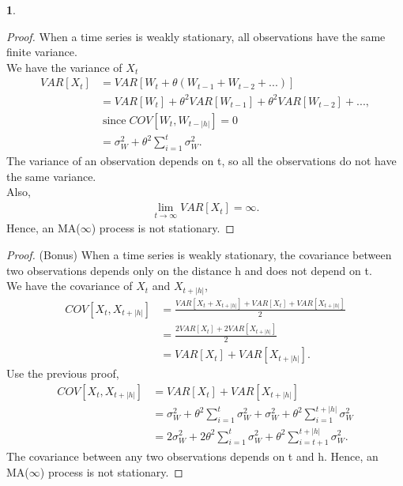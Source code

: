 \documentclass[10pt]{article}
\newtheorem{prob}{\bm{$Problem$}}
\begin{document}
\begin{prob}
\end{prob}
\begin{proof}
When a time series is weakly stationary, all observations have the same finite variance.\\
We have the variance of $X_t$
\begin{align*}
VAR[X_t]&=VAR[W_t+\theta(W_{t-1}+W_{t-2}+...)]\\
&=VAR[W_t]+\theta^2VAR[W_{t-1}]+\theta^2VAR[W_{t-2}]+...,\\ %
&\;\textrm{since}\;COV[W_t, W_{t-|h|}]=0\\
&=\sigma^2_W+\theta^2\sum^t_{i=1}\sigma^2_W. %
\end{align*}
The variance of an observation depends on t, so all the observations do not have the same variance.\\
Also,
\begin{align*}
\lim_{t\to\infty}VAR[X_t]=\infty.
\end{align*}
Hence, an MA($\infty$) process is not stationary.
\end{proof}
\begin{proof}
(Bonus) When a time series is weakly stationary, the covariance between two observations depends only on the distance h and does not depend on t.\\
We have the covariance of $X_t$ and $X_{t+|h|}$,
\begin{align*}
COV[X_t,X_{t+|h|}]&=\frac{VAR[X_t+X_{t+|h|}]+VAR[X_t]+VAR[X_{t+|h|}]}{2}\\
&=\frac{2VAR[X_t]+2VAR[X_{t+|h|}]}{2}\\
&=VAR[X_t]+VAR[X_{t+|h|}].
\end{align*}
Use the previous proof,
\begin{align*}
COV[X_t,X_{t+|h|}]&=VAR[X_t]+VAR[X_{t+|h|}]\\
&=\sigma^2_W+\theta^2\sum^t_{i=1}\sigma^2_W+\sigma^2_W+\theta^2\sum^{t+|h|}_{i=1}\sigma^2_W\\
&=2\sigma^2_W+2\theta^2\sum^t_{i=1}\sigma^2_W+\theta^2\sum^{t+|h|}_{i=t+1}\sigma^2_W.
\end{align*}
The covariance between any two observations depends on t and h. Hence, an MA($\infty$) process is not stationary.
\end{proof}
\end{document}
